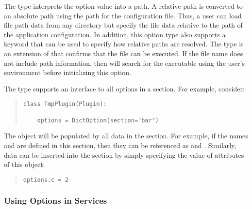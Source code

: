 The  type interprets the option value into a path.
A relative path is converted to an absolute path using the path for
the configuration file.  Thus, a user can load file path data from
any directory but specify the file data relative to the path of the
application configuration.  In addition, this option type also supports
a  keyword that can be used to specify how relative
paths are resolved.  The  type is an extension of
 that confirms that the file can be executed.  If the
file name does not include path information, then \pcasp will search
for the executable using the user's  environment before
initializing this option.

The  type supports an interface to all options in a section.
For example, consider:
\begin{quotation}
\begin{lstlisting}
class TmpPlugin(Plugin):

    options = DictOption(section="bar")
\end{lstlisting}
\end{quotation}
The  object will be populated by all data in the  section.
For example, if the names  and  are defined in this section, then
they can be referenced as  and .  Similarly,
data can be inserted into the  section by simply 
specifying the value of attributes of this object:
\begin{quotation}
\begin{lstlisting}
options.c = 2
\end{lstlisting}
\end{quotation}


\subsubsection{Using Options in Services}

